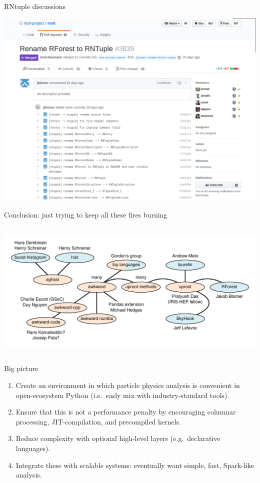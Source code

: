 \documentclass[aspectratio=169]{beamer}
\begin{document}
\begin{frame}{ RNtuple discussions}
\vspace{-0.04 cm}

\begin{center}
\includegraphics[width=0.85\linewidth]{rforest-rntuple.png}
\end{center}
\end{frame}

\begin{frame}{Conclusion: just trying to keep all these fires burning}
\vspace{0.5 cm}
\begin{columns}
\includegraphics[width=\linewidth]{projects.pdf}
\end{columns}
\end{frame}

\begin{frame}{Big picture}
\vspace{0.4 cm}
\Large

\begin{enumerate}\setlength{\itemsep}{0.25 cm}
\item Create an environment in which particle physics analysis is convenient in open-ecosystem Python (i.e.\ easly mix with industry-standard tools).
\item Ensure that this is not a performance penalty by encouraging columnar processing, JIT-compilation, and precompiled kernels.
\item Reduce complexity with optional high-level layers (e.g.\ declarative languages).
\item Integrate these with scalable systems: eventually want simple, fast, Spark-like analysis.
\end{enumerate}
\end{frame}
\end{document}

